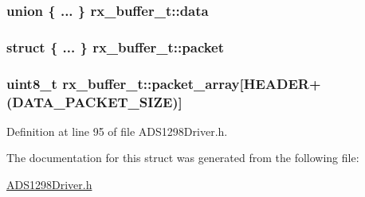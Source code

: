 \hypertarget{structrx__buffer__t_a81c8b33ce7d32d86c994e3db9c8b32c6}{
\subsubsection[{data}]{\setlength{\rightskip}{0pt plus 5cm}union \{ ... \}  {\bf rx\-\_\-buffer\-\_\-t\-::data}}}\label{structrx__buffer__t_a81c8b33ce7d32d86c994e3db9c8b32c6}
\hypertarget{structrx__buffer__t_a188d30440082b11b38ec018289ab2c66}{
\subsubsection[{packet}]{\setlength{\rightskip}{0pt plus 5cm}struct \{ ... \}  {\bf rx\-\_\-buffer\-\_\-t\-::packet}}}\label{structrx__buffer__t_a188d30440082b11b38ec018289ab2c66}
\hypertarget{structrx__buffer__t_a9dd47697370d70c9480f70f9de80809f}{
\subsubsection[{packet\-\_\-array}]{\setlength{\rightskip}{0pt plus 5cm}uint8\-\_\-t {\bf rx\-\_\-buffer\-\_\-t\-::packet\-\_\-array}\mbox{[}{\bf \-H\-E\-A\-D\-E\-R}+({\bf \-D\-A\-T\-A\-\_\-\-P\-A\-C\-K\-E\-T\-\_\-\-S\-I\-Z\-E})\mbox{]}}}\label{structrx__buffer__t_a9dd47697370d70c9480f70f9de80809f}


\-Definition at line 95 of file \-A\-D\-S1298\-Driver.\-h.



\-The documentation for this struct was generated from the following file\-:\begin{DoxyCompactItemize}
\item 
\hyperlink{_a_d_s1298_driver_8h}{\-A\-D\-S1298\-Driver.\-h}\end{DoxyCompactItemize}
